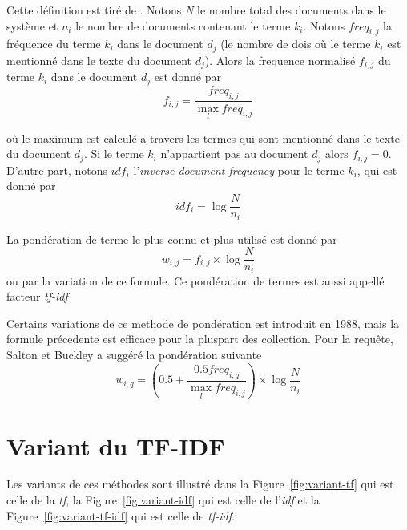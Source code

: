 \begin{definition}
    Cette définition est tiré de  . Notons \emph{N} le nombre total des documents dans le système et $n_{i}$ le nombre de documents contenant le terme $k_{i}$. Notons $freq_{i,j}$ la fréquence du terme $k_{i}$ dans le document $d_{j}$ (le nombre de dois où le terme $k_{i}$ est mentionné dans le texte du document $d_{j}$). Alors la frequence normalisé $f_{i,j}$ du terme $k_{i}$ dans le document $d_{j}$ est donné par
    \[
        f_{i,j} = \frac{freq_{i,j}}{\max_{l} freq_{i,j}}
    \]

    où le maximum est calculé a travers les termes qui sont mentionné dans le texte du document $d_{j}$. Si le terme $k_{i}$ n'appartient pas au document $d_{j}$ alors $f_{i,j} = 0$. D'autre part, notons $idf_{i}$ l'\emph{inverse document frequency} pour le terme $k_{i}$, qui est donné par
    \[
        idf_{i} = \log{\frac{N}{n_{i}}}
    \]

    La pondération de terme le plus connu et plus utilisé est donné par
    \[
        w_{i,j} = f_{i,j} \times \log{\frac{N}{n_{i}}}
    \]
    ou par la variation de ce formule. Ce pondération de termes est aussi appellé facteur \emph{tf-idf}
\end{definition}

Certains variations de ce methode de pondération est introduit en 1988, mais la formule précedente est efficace pour la pluspart des collection. Pour la requête, Salton et Buckley  a suggéré la pondération suivante
\[
    w_{i,q} = \left(0.5 + \frac{0.5 freq_{i,q}}{\max_{l} freq_{i,j}}\right) \times \log{\frac{N}{n_{i}}}
\]

\section{Variant du TF-IDF}
Les variants de ces méthodes sont illustré dans la Figure~\ref{fig:variant-tf} qui est celle de la \emph{tf}, la Figure~\ref{fig:variant-idf} qui est celle de l'\emph{idf} et la Figure~\ref{fig:variant-tf-idf} qui est celle de \emph{tf-idf}.


